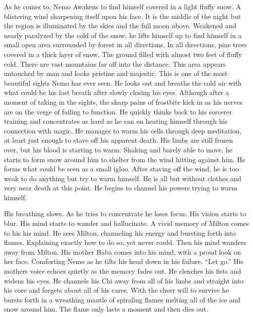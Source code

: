 \documentclass[letterpaper,10pt,twoside,twocolumn,openany]{book}
\begin{document}
As he comes to, Nemo Awakens to find himself covered in a light fluffy snow. A blistering wind sharpening itself upon his face. It is the middle of the night but the region is illuminated by the skies and the full moon above. Weakened and nearly paralyzed by the cold of the snow, he lifts himself up to find himself in a small open area surrounded by forest in all directions. In all directions, pine trees covered in a thick layer of snow. The ground filled with almost two feet of fluffy cold. There are vast mountains far off into the distance. This area appears untouched by man and looks pristine and majestic. This is one of the most beautiful sights Nemo has ever seen. He looks out and breaths the cold air with what could be his last breath after slowly closing his eyes. Although after a moment of taking in the sights, the sharp pains of frostbite kick in as his nerves are on the verge of failing to function. He quickly thinks back to his sorcerer training and concentrates as hard as he can on heating himself through his connection with magic. He manages to warm his cells through deep meditation, at least just enough to stave off his apparent death. His limbs are still frozen over, but his blood is starting to warm. Shaking and barely able to move, he starts to form snow around him to shelter from the wind hitting against him. He forms what could be seen as a small igloo. After staving off the wind, he is too weak to do anything but try to warm himself. He is all but without clothes and very near death at this point. He begins to channel his powers trying to warm himself. 

His breathing slows. As he tries to concentrate he loses focus. His vision starts to blur. His mind starts to wander and hallucinate. A vivid memory of Milton comes to his his mind. He sees Milton, channeling his energy and bursting forth into flames. Explaining exactly how to do so, yet never could. Then his mind wanders away from Milton. His mother Baba comes into his mind, with a proud look on her face. Comforting Nemo as he tilts his head down in his failure. ``Let go.'' His mothers voice echoes quietly as the memory fades out. He clenches his fists and widens his eyes. He channels his Chi away from all of his limbs and straight into his core and forgets about all of his cares. With the sheer will to survive he bursts forth in a wreathing mantle of spiraling flames melting all of the ice and snow around him. The flame only lasts a moment and then dies out. 
\end{document}

